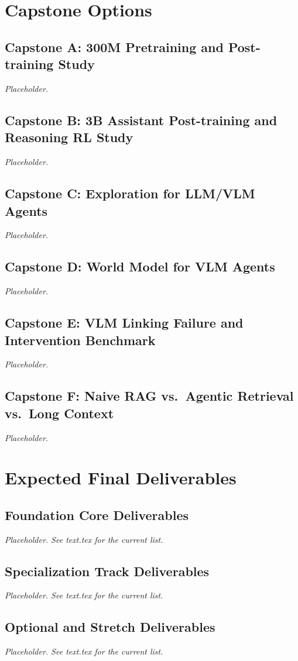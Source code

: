 \chapter*{Capstone Options}


\section*{Capstone A: 300M Pretraining and Post-training Study}
\textit{Placeholder.}

\section*{Capstone B: 3B Assistant Post-training and Reasoning RL Study}
\textit{Placeholder.}

\section*{Capstone C: Exploration for LLM/VLM Agents}
\textit{Placeholder.}

\section*{Capstone D: World Model for VLM Agents}
\textit{Placeholder.}

\section*{Capstone E: VLM Linking Failure and Intervention Benchmark}
\textit{Placeholder.}

\section*{Capstone F: Naive RAG vs.\ Agentic Retrieval vs.\ Long Context}
\textit{Placeholder.}

\chapter*{Expected Final Deliverables}


\section*{Foundation Core Deliverables}
\textit{Placeholder. See text.tex for the current list.}

\section*{Specialization Track Deliverables}
\textit{Placeholder. See text.tex for the current list.}

\section*{Optional and Stretch Deliverables}
\textit{Placeholder. See text.tex for the current list.}
